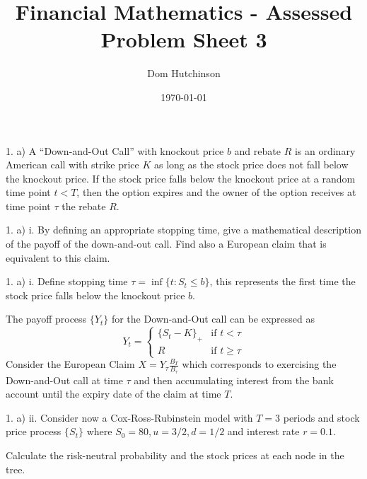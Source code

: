 \documentclass[11pt,a4paper]{article}
\begin{document}

\title{Financial Mathematics - Assessed Problem Sheet 3}
\author{Dom Hutchinson}
\date{\today}
\maketitle

\begin{question}{1. a)}
  A ``Down-and-Out Call'' with knockout price $b$ and rebate $R$ is an ordinary American call with strike price $K$ as long as the stock price does not fall below the knockout price. If the stock price falls below the knockout price at a random time point $t<T$, then the option expires and the owner of the option receives at time point $\tau$ the rebate $R$.
\end{question}

\begin{question}{1. a) i.}
  By defining an appropriate stopping time, give a mathematical description of the payoff of the down-and-out call. Find also a European claim that is equivalent to this claim.
\end{question}

\begin{answer}{1. a) i.}
  Define stopping time $\tau=\inf\{t:S_t\leq b\}$, this represents the first time the stock price falls below the knockout price $b$.
  \par The payoff process $\{Y_t\}$ for the Down-and-Out call can be expressed as
  \[ Y_t=\begin{cases}
  \{S_t-K\}_+&\text{if }t<\tau\\
  R&\text{if }t\geq\tau
  \end{cases} \]
  Consider the European Claim $X=Y_\tau\frac{B_T}{B_\tau}$ which corresponds to exercising the Down-and-Out call at time $\tau$ and then accumulating interest from the bank account until the expiry date of the claim at time $T$.
\end{answer}

\begin{question}{1. a) ii.}
  Consider now a Cox-Ross-Rubinstein model with $T=3$ periods and stock price process $\{S_t\}$ where $S_0=80,u=3/2,d=1/2$ and interest rate $r=0.1$.
  \par Calculate the risk-neutral probability and the stock prices at each node in the tree.
\end{question}
\end{document}
